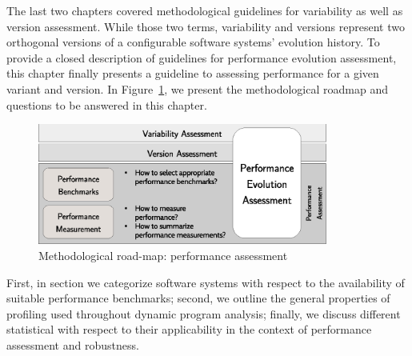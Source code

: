 The last two chapters covered methodological guidelines for variability as well
as version assessment. While those two terms, variability and versions
represent two orthogonal versions of a configurable software systems’ evolution
history. To provide a closed description of guidelines for performance
evolution assessment, this chapter finally presents a guideline to assessing
performance for a given variant and version. In Figure~\ref{fig:roadmap_3}, we
present the methodological roadmap and questions to be answered in this chapter.

\begin{figure}[h!]
	\centering
	\includegraphics[width=0.85\textwidth]{images/process_perfassessment.eps}
	\caption{Methodological road-map: performance assessment}
	\label{fig:roadmap_3}
\end{figure}

First, in section we categorize software systems with respect to the availability of suitable performance
benchmarks; second, we outline the general properties of  profiling used
throughout dynamic program analysis; finally, we discuss different statistical
with respect to their applicability in the context of performance assessment
and robustness.


